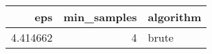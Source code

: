 \begin{tabular}{rrl}
\toprule
eps & min_samples & algorithm \\
\midrule
4.414662 & 4 & brute \\
\bottomrule
\end{tabular}
